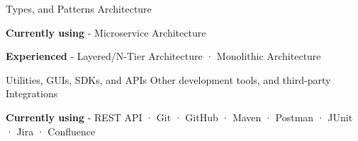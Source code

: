 \begin{cventries}
  \cventry
    {Types, and Patterns} %
    {Architecture} %
    {} %
    {} %
    {
      \begin{cvitems} %
        \item {\textbf{Currently using} \hspace{0.03cm} - \hspace{0.03cm} Microservice Architecture} %
        \item {\textbf{Experienced} \hspace{0.03cm} - \hspace{0.03cm} Layered/N-Tier Architecture \hspace{0.03cm} · \hspace{0.03cm} Monolithic Architecture \\} %
      \end{cvitems}
    }
  \cventry
    {Utilities, GUIs, SDKs, and APIs} %
    {Other development tools, and third-party Integrations} %
    {} %
    {} %
    {
      \begin{cvitems} %
        \item {\textbf{Currently using} \hspace{0.03cm} - \hspace{0.03cm} REST API \hspace{0.03cm} · \hspace{0.03cm} Git \hspace{0.03cm} · \hspace{0.03cm} GitHub \hspace{0.03cm} · \hspace{0.03cm} Maven \hspace{0.03cm} · \hspace{0.03cm} Postman \hspace{0.03cm} · \hspace{0.03cm} JUnit \hspace{0.03cm} · \hspace{0.03cm} Jira \hspace{0.03cm} · \hspace{0.03cm} Confluence } %

\end{cvitems}}
\end{cventries}
